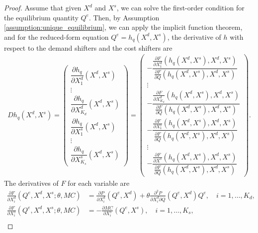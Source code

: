 \documentclass[11pt, a4paper]{article}
\theoremstyle{remark}
\begin{document}
\begin{proof}
Assume that given $X^{d}$ and $X^{s}$, we can solve the first-order condition for the equilibrium quantity $Q^e$.
Then, by Assumption \ref{assumption:unique_equilibrium}, we can apply the implicit function theorem, and for the reduced-form equation $Q^e = h_q(X^{d}, X^{s})$, the derivative of $h$ with respect to the demand shifters and the cost shifters are
\begin{align}
    Dh_q(X^{d}, X^{s}) = \begin{pmatrix}
        \dfrac{\partial h_q}{\partial X^{d}_{1}}(X^{d}, X^{s})\\
        \vdots \\
        \dfrac{\partial h_q}{\partial X^{d}_{K_d}}(X^{d}, X^{s})\\[1em]
        \dfrac{\partial h_q}{\partial X^{s}_{1}}(X^{d}, X^{s})\\
        \vdots \\
        \dfrac{\partial h_q}{\partial X^{s}_{K_s}}(X^{d}, X^{s})
    \end{pmatrix} = \begin{pmatrix}
        -\dfrac{\frac{\partial F}{\partial X^{d}_{1}}(h_q(X^{d}, X^{s}), X^{d}, X^{s})}{\frac{\partial F}{\partial Q}(h_q(X^{d}, X^{s}), X^{d}, X^{s})}\\
        \vdots \\
        -\dfrac{\frac{\partial F}{\partial X^{d}_{K_d}}(h_q(X^{d}, X^{s}), X^{d}, X^{s})}{\frac{\partial F}{\partial Q}(h_q(X^{d}, X^{s}), X^{d}, X^{s})}\\[1.5em]
        -\dfrac{\frac{\partial F}{\partial X^{s}_{1}}(h_q(X^{d}, X^{s}), X^{d}, X^{s})}{\frac{\partial F}{\partial Q}(h_q(X^{d}, X^{s}), X^{d}, X^{s})}\\
        \vdots \\        
        -\dfrac{\frac{\partial F}{\partial X^{s}}(h_q(X^{d}, X^{s}), X^{d}, X^{s})}{\frac{\partial F}{\partial Q}(h_q(X^{d}, X^{s}), X^{d}, X^{s})}
    \end{pmatrix}.\label{eq:foc_derivative_demand_supply}
\end{align}
The derivatives of $F$ for each variable are
\begin{align}
    \frac{\partial F}{\partial X^{d}_i}(Q^e, X^{d}, X^{s}; \theta, MC) & =  \frac{\partial P}{\partial X^{d}_{i}}(Q^e, X^{d}) + \theta\frac{\partial^2 P}{\partial X^{d}_{i}\partial Q}(Q^e, X^{d})Q^e, \quad i = 1, \ldots, K_d,\\
    \frac{\partial F}{\partial X^{s}_i}(Q^e, X^{d}, X^{s}; \theta, MC) & =  -\frac{\partial MC}{\partial X^{s}_{i}}(Q^e, X^{s}), \quad i = 1, \ldots, K_s, \\

\end{align}
\end{proof}
\end{document}
